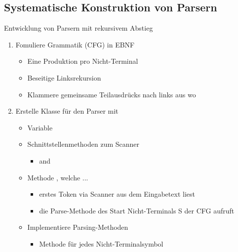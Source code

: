\subsection{Systematische Konstruktion von Parsern}
Entwicklung von Parsern mit rekursivem Abstieg
\begin{enumerate}
    \item Fomuliere Grammatik (CFG) in EBNF
    \begin{itemize}
        \item Eine Produktion pro Nicht-Terminal
        \item Beseitige  Linksrekursion
        \item Klammere gemeinsame Teilausdrücks nach links aus wo 
    \end{itemize}
    \item Erstelle Klasse für den Parser mit 
    \begin{itemize}
        \item {} Variable 
        \item Schnittstellenmethoden zum Scanner
        \begin{itemize}
            \item {} and 
        \end{itemize}
        \item {} Methode , welche ...
        \begin{itemize}
            \item erstes Token via Scanner aus dem Eingabetext liest
            \item die Parse-Methode des Start Nicht-Terminals S der CFG aufruft
        \end{itemize}
        \item Implementiere  Parsing-Methoden
        \begin{itemize}
            \item Methode  für jedes Nicht-Terminalsymbol 
        \end{itemize}
    \end{itemize}
\end{enumerate}